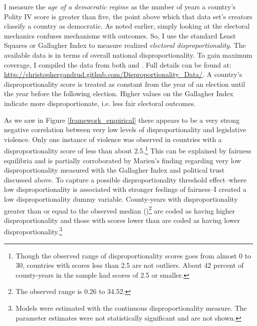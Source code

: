 \documentclass[a4paper]{article}\usepackage[]{graphicx}\usepackage[]{color}
\begin{document}
I measure the {\emph{age of a democratic regime}} as the number of years a country's Polity IV score \citep{Marshall2009} is greater than five, the point above which that data set's creators classify a country as democratic.  As noted earlier, simply looking at the electoral mechanics confuses mechanisms with outcomes. So, I use the standard Least Squares or Gallagher Index \citep{Gallagher1991} to measure realized {\emph{electoral disproportionality}}. The available data is in terms of overall national disproportionality. To gain maximum coverage, I compiled the data from both \cite{Gallagher2012} and \cite{Carey2011}. Full details can be found at: \url{http://christophergandrud.github.com/Disproportionality_Data/}. A country's disproportionality score is treated as constant from the year of an election until the year before the following election. Higher values on the Gallagher Index indicate more disproportionate, i.e. less fair electoral outcomes.

As we saw in Figure \ref{framework_empirical} there appears to be a very strong negative correlation between very low levels of disproportionality and legislative violence. Only one instance of violence was observed in countries with a disproportionality score of less than about 2.5.\footnote{Though the observed range of disproportionality scores goes from almost 0 to 30, countries with scores less than 2.5 are not outliers. About 42 percent of county-years in the sample had scores of 2.5 or smaller.} This can be explained by fairness equilibria and is partially corroborated by Marien's \citeyearpar{Marien2011} finding regarding very low disproportionality measured with the Gallagher Index and political trust discussed above. To capture a possible disproportionality threshold effect--where low disproportionality is associated with stronger feelings of fairness--I created a low disproportionality dummy variable. County-years with disproportionality greater than or equal to the observed median ()\footnote{The observed range is 0.26 to 34.52.} are coded as having higher disproportionality and those with scores lower than  are coded as having lower disproportionality.\footnote{Models were estimated with the continuous disproportionality measure. The parameter estimates were not statistically significant and are not shown.}
\end{document}
